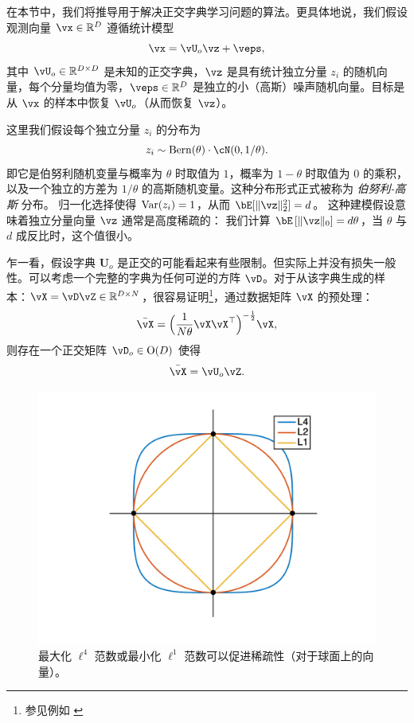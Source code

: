 \documentclass[../../book-main.tex]{subfiles}
\begin{document}
在本节中，我们将推导用于解决正交字典学习问题的算法。更具体地说，我们假设观测向量 $\vx \in \R^D$ 遵循统计模型
\begin{equation}
    \vx = \vU_o \vz + \veps, 
    \label{eq:ica-model-ch2}
\end{equation}
其中 $\vU_o \in \R^{D \times D}$ 是未知的正交字典，$\vz$ 是具有统计独立分量 $z_i$ 的随机向量，每个分量均值为零，$\veps \in \R^D$ 是独立的小（高斯）噪声随机向量。目标是从 $\vx$ 的样本中恢复 $\vU_o$（从而恢复 $\vz$）。

这里我们假设每个独立分量 $z_i$ 的分布为 $$z_i \sim \mathrm{Bern}(\theta) \cdot \cN(0, 1/\theta).$$ 即它是伯努利随机变量与概率为 $\theta$ 时取值为 $1$，概率为 $1-\theta$ 时取值为 $0$ 的乘积，以及一个独立的方差为 $1/\theta$ 的高斯随机变量。这种分布形式正式被称为 {\em 伯努利-高斯} 分布。 
归一化选择使得 $\operatorname{Var}(z_i) = 1$，从而 $\bE[\norm{\vz}_2^2]=d$。 
这种建模假设意味着独立分量向量 $\vz$ 通常是高度稀疏的： 
我们计算 $\bE\left[\norm{\vz}_0\right] = d\theta$，当 $\theta$ 与 $d$ 成反比时，这个值很小。

\begin{remark}[正交假设] 
乍一看，假设字典 $\bm U_o$ 是正交的可能看起来有些限制。但实际上并没有损失一般性。可以考虑一个完整的字典为任何可逆的方阵 $\vD$。对于从该字典生成的样本：$\vX = \vD \vZ \in \mathbb{R}^{D\times N}$，很容易证明\footnote{参见例如 \cite{sun2017completeI}}，通过数据矩阵 $\vX$ 的预处理： 
\begin{equation}
    \bar{\vX} = \Big(\frac{1}{N\theta} \vX\vX^\top\Big)^{-\frac{1}{2}}\vX,
\end{equation}
则存在一个正交矩阵 $\vD_o \in \mathrm{O}(D)$ 使得
\begin{equation}
    \bar{\vX} = \vU_o\vZ.
\end{equation}
\end{remark}

\begin{figure}
    \centering
    \includegraphics[width=0.6\linewidth]{figs_chap2/2DL4Sphere.png}
    \caption{最大化 $\ell^4$ 范数或最小化 $\ell^1$ 范数可以促进稀疏性（对于球面上的向量）。}
    \label{fig:L4-sphere}
\end{figure}
\end{document}
